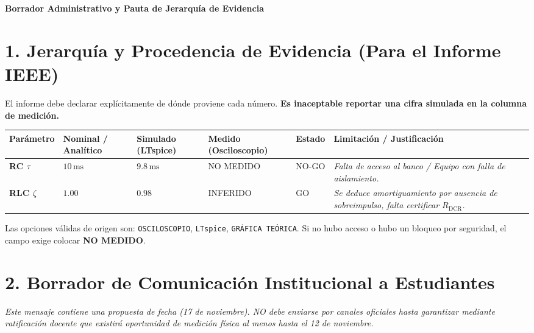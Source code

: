 \documentclass[11pt, a4paper]{article}
\begin{document}
\begin{tcolorbox}[colback=ucbblue!5!white, colframe=ucbblue, title=\textbf{Artefacto A2: Estructuración Documental e Informe IEEE EC3}]
    \centering \textbf{Borrador Administrativo y Pauta de Jerarquía de Evidencia}
\end{tcolorbox}

\section*{1. Jerarquía y Procedencia de Evidencia (Para el Informe IEEE)}
El informe debe declarar explícitamente de dónde proviene cada número. \textbf{Es inaceptable reportar una cifra simulada en la columna de medición.}

\vspace{0.2cm}
\renewcommand{\arraystretch}{1.5}
\noindent
\begin{tabularx}{\textwidth}{
  >{\bfseries\RaggedRight\hsize=1.0\hsize}X 
  >{\centering\arraybackslash\hsize=0.8\hsize}X 
  >{\centering\arraybackslash\hsize=0.8\hsize}X 
  >{\centering\arraybackslash\hsize=0.8\hsize}X 
  >{\centering\arraybackslash\hsize=0.6\hsize}X 
  >{\RaggedRight\arraybackslash\hsize=2.0\hsize}X}
\toprule
\textbf{Parámetro} & \textbf{Nominal / Analítico} & \textbf{Simulado (LTspice)} & \textbf{Medido (Osciloscopio)} & \textbf{Estado} & \textbf{Limitación / Justificación} \\
\midrule
RC $\tau$ & $10\,\text{ms}$ & $9.8\,\text{ms}$ & NO MEDIDO & NO-GO & \textit{Falta de acceso al banco / Equipo con falla de aislamiento.} \\
RLC $\zeta$ & $1.00$ & $0.98$ & INFERIDO & GO & \textit{Se deduce amortiguamiento por ausencia de sobreimpulso, falta certificar $R_{\text{DCR}}$.} \\
\bottomrule
\end{tabularx}
\vspace{0.2cm}

Las opciones válidas de origen son: \texttt{OSCILOSCOPIO}, \texttt{LTspice}, \texttt{GRÁFICA TEÓRICA}. Si no hubo acceso o hubo un bloqueo por seguridad, el campo exige colocar \textbf{NO MEDIDO}.

\section*{2. Borrador de Comunicación Institucional a Estudiantes}
\textit{Este mensaje contiene una propuesta de fecha (17 de noviembre). NO debe enviarse por canales oficiales hasta garantizar mediante ratificación docente que existirá oportunidad de medición física al menos hasta el 12 de noviembre.}
\end{document}
